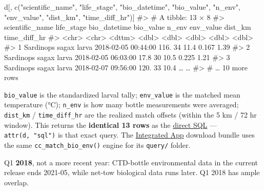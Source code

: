 \documentclass[
  letterpaper,
  DIV=11,
  numbers=noendperiod]{scrreprt}
\newenvironment{Shaded}{\begin{snugshade}}{\end{snugshade}}
\newcommand{\CommentTok}[1]{\textcolor[rgb]{0.37,0.37,0.37}{#1}}
\newcommand{\FunctionTok}[1]{\textcolor[rgb]{0.28,0.35,0.67}{#1}}
\newcommand{\NormalTok}[1]{\textcolor[rgb]{0.00,0.23,0.31}{#1}}
\newcommand{\StringTok}[1]{\textcolor[rgb]{0.13,0.47,0.30}{#1}}
\begin{document}
\begin{Shaded}
\begin{Highlighting}[]
\NormalTok{d[, }\FunctionTok{c}\NormalTok{(}\StringTok{"scientific\_name"}\NormalTok{, }\StringTok{"life\_stage"}\NormalTok{, }\StringTok{"bio\_datetime"}\NormalTok{,}
      \StringTok{"bio\_value"}\NormalTok{, }\StringTok{"n\_env"}\NormalTok{, }\StringTok{"env\_value"}\NormalTok{, }\StringTok{"dist\_km"}\NormalTok{, }\StringTok{"time\_diff\_hr"}\NormalTok{)]}
\CommentTok{\#\textgreater{} \# A tibble: 13 × 8}
\CommentTok{\#\textgreater{}   scientific\_name life\_stage bio\_datetime        bio\_value n\_env env\_value dist\_km time\_diff\_hr}
\CommentTok{\#\textgreater{}   \textless{}chr\textgreater{}           \textless{}chr\textgreater{}      \textless{}dttm\textgreater{}                  \textless{}dbl\textgreater{} \textless{}dbl\textgreater{}     \textless{}dbl\textgreater{}   \textless{}dbl\textgreater{}        \textless{}dbl\textgreater{}}
\CommentTok{\#\textgreater{} 1 Sardinops sagax larva      2018{-}02{-}05 00:44:00     116.     34      11.4   0.167         1.39}
\CommentTok{\#\textgreater{} 2 Sardinops sagax larva      2018{-}02{-}05 06:03:00      17.8    30      10.5   0.225         1.21}
\CommentTok{\#\textgreater{} 3 Sardinops sagax larva      2018{-}02{-}07 09:56:00     120.     33      10.4   …             …}
\CommentTok{\#\textgreater{} \# … 10 more rows}
\end{Highlighting}
\end{Shaded}

\texttt{bio\_value} is the standardized larval tally;
\texttt{env\_value} is the matched mean temperature (°C);
\texttt{n\_env} is how many bottle measurements were averaged;
\texttt{dist\_km} / \texttt{time\_diff\_hr} are the realized match
offsets (within the 5 km / 72 hr window). This returns the
\textbf{identical 13 rows} as the \hyperref[sec-worked-example]{direct
SQL} --- \texttt{attr(d,\ "sql")} is that exact query. The
\href{https://app.calcofi.io/db-viz-hex}{Integrated App} download bundle
uses the same \texttt{cc\_match\_bio\_env()} engine for its
\texttt{query/} folder.

\begin{tcolorbox}[enhanced jigsaw, arc=.35mm, colback=white, left=2mm, leftrule=.75mm, titlerule=0mm, bottomrule=.15mm, colbacktitle=quarto-callout-note-color!10!white, colframe=quarto-callout-note-color-frame, rightrule=.15mm, title=\textcolor{quarto-callout-note-color}{\faInfo}\hspace{0.5em}{Note}, breakable, opacityback=0, toptitle=1mm, toprule=.15mm, coltitle=black, bottomtitle=1mm, opacitybacktitle=0.6]

Q1 \textbf{2018}, not a more recent year: CTD-bottle environmental data
in the current release ends 2021-05, while net-tow biological data runs
later. Q1 2018 has ample overlap.

\end{tcolorbox}
\end{document}
